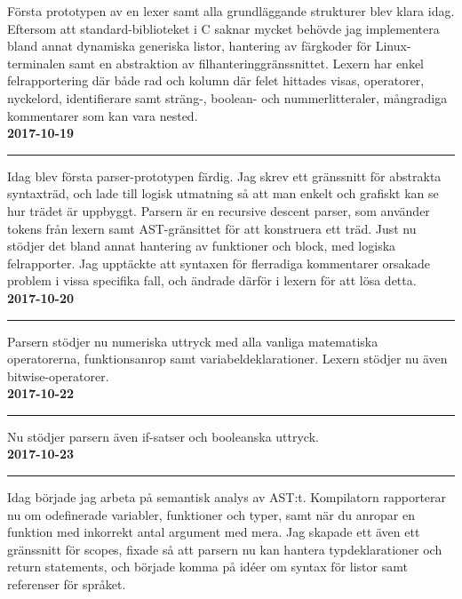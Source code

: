 \documentclass{theme}
\begin{document}
\noindent 
Första prototypen av en lexer samt alla grundläggande strukturer blev klara 
idag. Eftersom att standard-biblioteket i C saknar mycket behövde jag 
implementera bland annat dynamiska generiska listor, hantering av färgkoder
för Linux-terminalen samt en abstraktion av filhanteringgränssnittet. Lexern 
har enkel felrapportering där både rad och kolumn där felet hittades visas, 
operatorer, nyckelord, identifierare samt sträng-, boolean- och 
nummerlitteraler, mångradiga kommentarer som kan vara nested. \\

\noindent\textbf{2017-10-19}\\
\noindent\rule{\textwidth}{1pt}

\noindent 
Idag blev första parser-prototypen färdig. Jag skrev ett gränssnitt för 
abstrakta syntaxträd, och lade till logisk utmatning så att man enkelt och 
grafiskt kan se hur trädet är uppbyggt. Parsern är en recursive descent parser, 
som använder tokens från lexern samt AST-gränsittet för att konstruera ett träd.
Just nu stödjer det bland annat hantering av funktioner och block, med logiska 
felrapporter. Jag upptäckte att syntaxen för flerradiga kommentarer orsakade 
problem i vissa specifika fall, och ändrade därför i lexern för att lösa detta.
\\

\noindent\textbf{2017-10-20}\\
\noindent\rule{\textwidth}{1pt}

\noindent 
Parsern stödjer nu numeriska uttryck med alla vanliga matematiska operatorerna,
funktionsanrop samt variabeldeklarationer. Lexern stödjer nu även 
bitwise-operatorer.\\

\noindent\textbf{2017-10-22}\\
\noindent\rule{\textwidth}{1pt}

\noindent 
Nu stödjer parsern även if-satser och booleanska uttryck.\\

\noindent\textbf{2017-10-23}\\
\noindent\rule{\textwidth}{1pt}

\noindent 
Idag började jag arbeta på semantisk analys av AST:t. Kompilatorn rapporterar 
nu om odefinerade variabler, funktioner och typer, samt när du anropar en 
funktion med inkorrekt antal argument med mera.  Jag skapade ett även ett 
gränssnitt för scopes, fixade så att parsern nu kan hantera typdeklarationer och
return statements, och började komma på idéer om syntax för listor samt 
referenser för språket. \\
\end{document}
